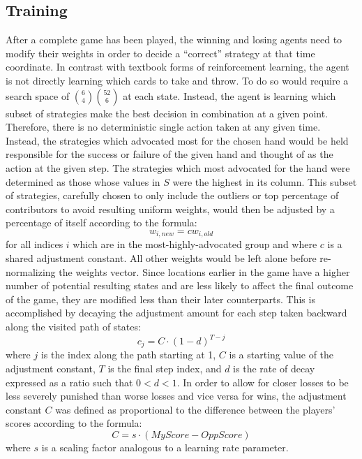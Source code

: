 
\subsection{Training}
\label{sec:dm-methods-training}




After a complete game has been played, the winning and losing agents need to
modify their weights in order to decide a ``correct'' strategy at that time
coordinate.
%
In contrast with textbook forms of reinforcement learning,
the agent is not directly learning which cards to take and throw.
%
To do so would require a search space of ${6 \choose 4}{52 \choose 6}$
at each state.
%
Instead, the agent is learning which subset of strategies make the best
decision in combination at a given point.
%
Therefore, there is no deterministic single action taken at any given
time.
%
Instead, the strategies which advocated most for the chosen hand would be held
responsible for the success or failure of the given hand and thought of as
the action at the given step.
%
The strategies which most advocated for the hand were determined as those whose
values in $S$ were the highest in its column.
%
This subset of strategies,
carefully chosen to only include the outliers or top percentage of contributors
to avoid resulting uniform weights,
would then be adjusted by a percentage of itself according to the formula:
\[
	w_{i,new} = c w_{i,old}
\]
for all indices $i$ which are in the most-highly-advocated group and
where $c$ is a shared adjustment constant.
%
All other weights would be left alone before re-normalizing the weights vector.
%
Since locations earlier in the game have a higher number of potential resulting
states and are less likely to affect the final outcome of the game,
they are modified less than their later counterparts.
%
This is accomplished by decaying the adjustment amount for each step taken
backward along the visited path of states:
\[
	c_j = C \cdot (1 - d)^{T-j}
\]
where $j$ is the index along the path starting at 1,
$C$ is a starting value of the adjustment constant,
$T$ is the final step index,
and $d$ is the rate of decay expressed as a ratio such that $0 < d < 1$.
%
In order to allow for closer losses to be less severely punished than worse
losses and vice versa for wins,
the adjustment constant $C$ was defined as proportional to the difference
between the players' scores according to the formula:
\[
	C = s \cdot \left({MyScore} - {OppScore}\right) 
\]
where $s$ is a scaling factor analogous to a learning rate parameter.

